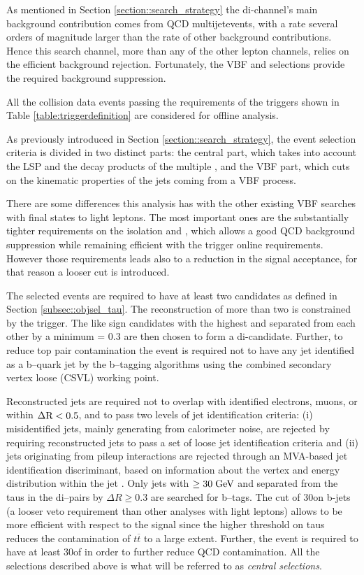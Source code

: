 As mentioned in Section \ref{section::search_strategy} the di-\hadtau channel's main background contribution comes from QCD multijetevents, with a rate several orders of magnitude larger than the rate of other background contributions. Hence this search channel, more than any of the other lepton channels, relies on the efficient background rejection. Fortunately, the VBF and \met selections provide the required background suppression.

All the collision data events passing the requirements of the triggers shown in Table \ref{table:triggerdefinition} are considered for offline analysis. 

As previously introduced in Section \ref{section::search_strategy}, the event selection criteria is divided in two distinct parts: the central part, which takes into account the LSP and the decay products of the multiple \hadtau, and the VBF part, which cuts on the kinematic properties of the jets coming from a VBF process. 

There are some differences this analysis has with the other existing VBF searches with final states to light leptons. The most important ones are the substantially tighter requirements on the \hadtau isolation and \pt, which allows a good QCD background suppression while remaining efficient with the trigger online requirements. However those requirements leads also to a reduction in the signal acceptance, for that reason a looser \met cut is introduced.

The selected events are required to have at least two \hadtau candidates as defined in Section \ref{subsec::objsel_tau}. The reconstruction of more than two \hadtau is constrained by the trigger. The like sign \hadtau candidates with the highest \pt and separated from each other by a minimum \deltar = 0.3 are then chosen to form a di-\hadtau candidate. 
Further, to reduce top pair contamination the event is required not to have any jet identified as a b--quark jet by the b--tagging algorithms using the {\textit combined secondary vertex loose} (CSVL) working point. 

Reconstructed jets are required not to overlap with identified electrons, muons, or \hadtau within \ensuremath{\deltar < 0.5}, and to pass two levels of jet identification criteria: (i) misidentified jets, mainly generating from calorimeter noise, are rejected by requiring reconstructed jets to pass a set of loose jet identification criteria \cite{CMS:2010xta} and (ii) jets originating from pileup interactions are rejected through an MVA-based jet identification discriminant, based on information about the vertex and energy distribution within the jet \cite{CMS:2013wea}. Only jets with \pt $\ge 30\;\text{Ge}\kern-0.06667em\text{V}$ and separated from the taus in the di--\hadtau pairs by $\Delta R \ge 0.3$ are searched for b--tags. The \pt cut of 30\gev on b-jets (a looser veto requirement than other analyses with light leptons) allows to be more efficient with respect to the signal since the higher \pt threshold on taus reduces the contamination of $t\overline{t}$ to a large extent. Further, the event is required to have at least 30\gev of \met in order to further reduce QCD contamination. All the selections described above is what will be referred to as \textit{central selections}.

